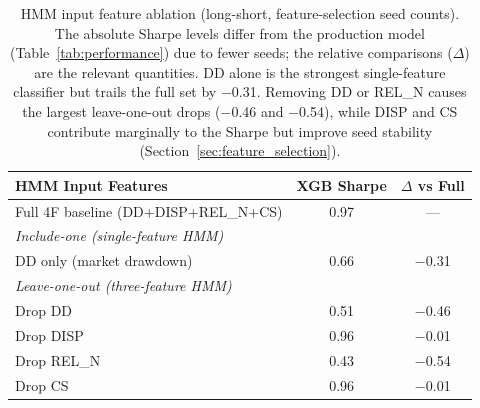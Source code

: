 \begin{table}[H]
\centering
\smallskip
\begin{tabular}{lcc}
\toprule
HMM Input Features & XGB Sharpe & $\Delta$ vs Full \\
\midrule
Full 4F baseline (DD+DISP+REL\_N+CS) & 0.97 & --- \\
\midrule
\multicolumn{3}{l}{\textit{Include-one (single-feature HMM)}} \\[2pt]
DD only (market drawdown)              & 0.66 & $-$0.31 \\
\midrule
\multicolumn{3}{l}{\textit{Leave-one-out (three-feature HMM)}} \\[2pt]
Drop DD                                & 0.51 & $-$0.46 \\
Drop DISP                              & 0.96 & $-$0.01 \\
Drop REL\_N                            & 0.43 & $-$0.54 \\
Drop CS                                & 0.96 & $-$0.01 \\
\bottomrule
\end{tabular}
\caption{HMM input feature ablation (long-short, feature-selection seed counts). The absolute Sharpe levels differ from the production model (Table~\ref{tab:performance}) due to fewer seeds; the relative comparisons ($\Delta$) are the relevant quantities. DD alone is the strongest single-feature classifier but trails the full set by $-$0.31. Removing DD or REL\_N causes the largest leave-one-out drops ($-$0.46 and $-$0.54), while DISP and CS contribute marginally to the Sharpe but improve seed stability (Section~\ref{sec:feature_selection}).}
\label{tab:hmm_feature_ablation}
\end{table}
